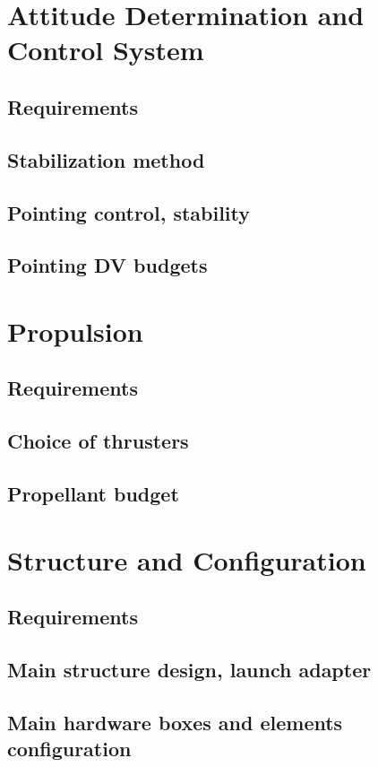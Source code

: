 \section{Attitude Determination and Control System} 
\subsection{Requirements}
\subsection{Stabilization method}
\subsection{Pointing control, stability}
\subsection{Pointing DV budgets}

\section{Propulsion}
\subsection{Requirements}
\subsection{Choice of thrusters}
\subsection{Propellant budget}

\section{Structure and Configuration} 
\subsection{Requirements}
\subsection{Main structure design, launch adapter}
\subsection{Main hardware boxes and elements configuration}
